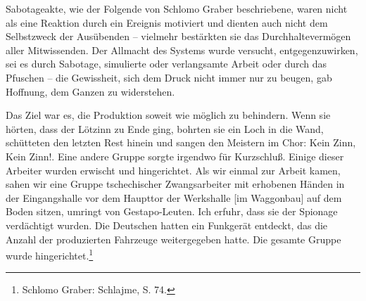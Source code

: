 Sabotageakte, wie der Folgende von Schlomo Graber beschriebene, waren nicht als eine Reaktion durch ein Ereignis motiviert und dienten auch nicht dem Selbstzweck der Ausübenden -- vielmehr bestärkten sie das Durchhaltevermögen aller Mitwissenden. Der Allmacht des Systems wurde versucht, entgegenzuwirken, sei es durch Sabotage, simulierte oder verlangsamte Arbeit oder durch das Pfuschen -- die Gewissheit, sich dem Druck nicht immer nur zu beugen, gab Hoffnung, dem Ganzen zu widerstehen.
\label{loetzinn}
\begin{leftbar}
Das Ziel war es, die Produktion soweit wie möglich zu behindern. Wenn sie hörten, dass der Lötzinn zu Ende ging, bohrten sie ein Loch in die Wand, schütteten den letzten Rest hinein und sangen den Meistern im Chor: \glqq Kein Zinn, Kein Zinn!\grqq. Eine andere Gruppe sorgte irgendwo für Kurzschluß. Einige dieser Arbeiter wurden erwischt und hingerichtet. Als wir einmal zur Arbeit kamen, sahen wir eine Gruppe tschechischer Zwangsarbeiter mit erhobenen Händen in der Eingangshalle vor dem Haupttor der Werkshalle [im Waggonbau] auf dem Boden sitzen, umringt von Gestapo-Leuten. Ich erfuhr, dass sie der Spionage verdächtigt wurden. Die Deutschen hatten ein Funkgerät entdeckt, das die Anzahl der produzierten Fahrzeuge weitergegeben hatte. Die gesamte Gruppe wurde hingerichtet.\footnote{Schlomo Graber: Schlajme, S. 74.}
\end{leftbar}
